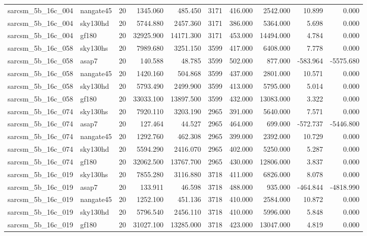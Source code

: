 \begin{longtable}{llrrrrrrrr}
sarcsm\_5b\_16c\_004 & nangate45 & 20 & 1345.060 & 485.450 & 3171 & 416.000 & 2542.000 & 10.899 & 0.000 \\
sarcsm\_5b\_16c\_004 & sky130hd & 20 & 5744.880 & 2457.360 & 3171 & 386.000 & 5364.000 & 5.698 & 0.000 \\
sarcsm\_5b\_16c\_004 & gf180 & 20 & 32925.900 & 14171.300 & 3171 & 453.000 & 14494.000 & 4.784 & 0.000 \\
sarcsm\_5b\_16c\_058 & sky130hs & 20 & 7989.680 & 3251.150 & 3599 & 417.000 & 6408.000 & 7.778 & 0.000 \\
sarcsm\_5b\_16c\_058 & asap7 & 20 & 140.588 & 48.785 & 3599 & 502.000 & 877.000 & -583.964 & -5575.680 \\
sarcsm\_5b\_16c\_058 & nangate45 & 20 & 1420.160 & 504.868 & 3599 & 437.000 & 2801.000 & 10.571 & 0.000 \\
sarcsm\_5b\_16c\_058 & sky130hd & 20 & 5793.490 & 2499.900 & 3599 & 413.000 & 5795.000 & 5.014 & 0.000 \\
sarcsm\_5b\_16c\_058 & gf180 & 20 & 33033.100 & 13897.500 & 3599 & 432.000 & 13083.000 & 3.322 & 0.000 \\
sarcsm\_5b\_16c\_074 & sky130hs & 20 & 7920.110 & 3203.190 & 2965 & 391.000 & 5640.000 & 7.571 & 0.000 \\
sarcsm\_5b\_16c\_074 & asap7 & 20 & 127.464 & 44.527 & 2965 & 464.000 & 699.000 & -572.737 & -5446.800 \\
sarcsm\_5b\_16c\_074 & nangate45 & 20 & 1292.760 & 462.308 & 2965 & 399.000 & 2392.000 & 10.729 & 0.000 \\
sarcsm\_5b\_16c\_074 & sky130hd & 20 & 5594.290 & 2416.070 & 2965 & 402.000 & 5250.000 & 5.287 & 0.000 \\
sarcsm\_5b\_16c\_074 & gf180 & 20 & 32062.500 & 13767.700 & 2965 & 430.000 & 12806.000 & 3.837 & 0.000 \\
sarcsm\_5b\_16c\_019 & sky130hs & 20 & 7855.280 & 3116.880 & 3718 & 411.000 & 6826.000 & 8.078 & 0.000 \\
sarcsm\_5b\_16c\_019 & asap7 & 20 & 133.911 & 46.598 & 3718 & 488.000 & 935.000 & -464.844 & -4818.990 \\
sarcsm\_5b\_16c\_019 & nangate45 & 20 & 1252.100 & 451.136 & 3718 & 410.000 & 2584.000 & 10.872 & 0.000 \\
sarcsm\_5b\_16c\_019 & sky130hd & 20 & 5796.540 & 2456.110 & 3718 & 410.000 & 5996.000 & 5.848 & 0.000 \\
sarcsm\_5b\_16c\_019 & gf180 & 20 & 31027.100 & 13285.000 & 3718 & 423.000 & 13047.000 & 4.819 & 0.000 \\

\end{longtable}
